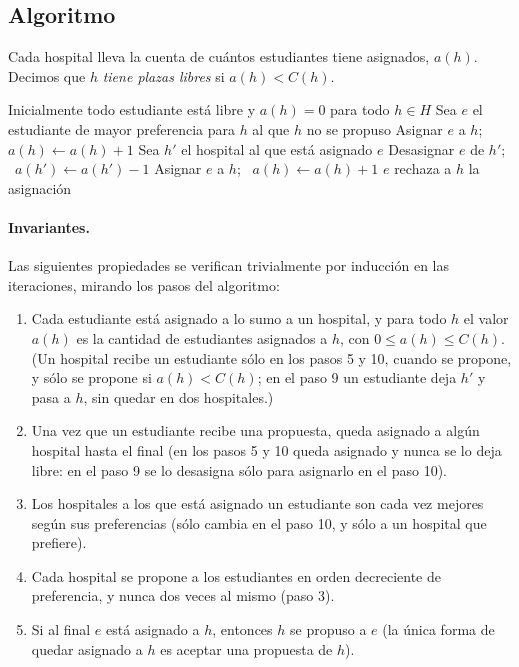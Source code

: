 \subsection*{Algoritmo}
Cada hospital lleva la cuenta de cuántos estudiantes tiene asignados, $a(h)$. Decimos que $h$
\emph{tiene plazas libres} si $a(h)<C(h)$.

\begin{algorithm}[H]
\caption{Gale--Shapley para hospitales y estudiantes}
\begin{algorithmic}[1]
\State Inicialmente todo estudiante está libre y $a(h)=0$ para todo $h\in H$
  \State Sea $e$ el estudiante de mayor preferencia para $h$ al que $h$ no se propuso
    \State Asignar $e$ a $h$; \ $a(h)\gets a(h)+1$
  \Else
    \State Sea $h'$ el hospital al que está asignado $e$
      \State Desasignar $e$ de $h'$; \ $a(h')\gets a(h')-1$
      \State Asignar $e$ a $h$; \ $a(h)\gets a(h)+1$
    \Else
      \State $e$ rechaza a $h$
    \EndIf
  \EndIf
\EndWhile
\State \Return la asignación
\end{algorithmic}
\end{algorithm}

\paragraph{Invariantes.} Las siguientes propiedades se verifican trivialmente por inducción en
las iteraciones, mirando los pasos del algoritmo:
\begin{enumerate}[label=(I\arabic*)]
  \item Cada estudiante está asignado a lo sumo a un hospital, y para todo $h$ el valor $a(h)$
        es la cantidad de estudiantes asignados a $h$, con $0\le a(h)\le C(h)$. (Un hospital
        recibe un estudiante sólo en los pasos 5 y 10, cuando se propone, y sólo se propone si
        $a(h)<C(h)$; en el paso 9 un estudiante deja $h'$ y pasa a $h$, sin quedar en dos
        hospitales.)
  \item Una vez que un estudiante recibe una propuesta, queda asignado a algún hospital hasta el
        final (en los pasos 5 y 10 queda asignado y nunca se lo deja libre: en el paso 9 se lo
        desasigna sólo para asignarlo en el paso 10).
  \item Los hospitales a los que está asignado un estudiante son cada vez mejores según sus
        preferencias (sólo cambia en el paso 10, y sólo a un hospital que prefiere).
  \item Cada hospital se propone a los estudiantes en orden decreciente de preferencia, y nunca
        dos veces al mismo (paso 3).
  \item Si al final $e$ está asignado a $h$, entonces $h$ se propuso a $e$ (la única forma de
        quedar asignado a $h$ es aceptar una propuesta de $h$).
\end{enumerate}

